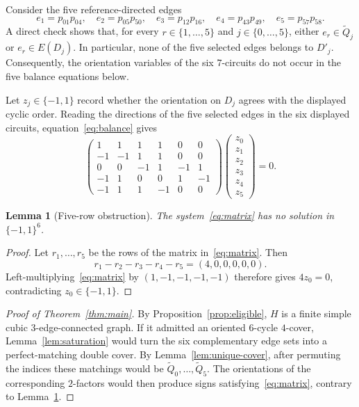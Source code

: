 \documentclass[11pt]{article}
\newtheorem{lemma}[theorem]{Lemma}
\theoremstyle{definition}
\begin{document}
Consider the five reference-directed edges
\begin{equation}\label{eq:selected-edges}
e_1=p_{01}p_{04},\quad
e_2=p_{05}p_{50},\quad
e_3=p_{12}p_{16},\quad
e_4=p_{43}p_{49},\quad
e_5=p_{57}p_{58}.
\end{equation}
A direct check shows that, for every $r\in\{1,\ldots,5\}$ and
$j\in\{0,\ldots,5\}$, either $e_r\in\widetilde Q_j$ or
$e_r\in E(D_j)$.  In particular, none of the five selected edges belongs to
$D'_j$.  Consequently, the orientation variables of the six $7$-circuits do
not occur in the five balance equations below.

Let $z_j\in\{-1,1\}$ record whether the orientation on $D_j$ agrees with the
displayed cyclic order.  Reading the directions of the five selected edges in
the six displayed circuits, equation~\eqref{eq:balance} gives
\begin{equation}\label{eq:matrix}
\begin{pmatrix}
 1& 1& 1& 1& 0& 0\\
-1&-1& 1& 1& 0& 0\\
 0& 0&-1& 1&-1& 1\\
-1& 1& 0& 0& 1&-1\\
-1& 1& 1&-1& 0& 0
\end{pmatrix}
\begin{pmatrix}
z_0\\
z_1\\
z_2\\
z_3\\
z_4\\
z_5
\end{pmatrix}
=0.
\end{equation}

\begin{lemma}[Five-row obstruction]\label{lem:obstruction}
The system~\eqref{eq:matrix} has no solution in $\{-1,1\}^6$.
\end{lemma}

\begin{proof}
Let $r_1,\ldots,r_5$ be the rows of the matrix in~\eqref{eq:matrix}.  Then
\[
r_1-r_2-r_3-r_4-r_5=(4,0,0,0,0,0).
\]
Left-multiplying~\eqref{eq:matrix} by $(1,-1,-1,-1,-1)$ therefore gives
$4z_0=0$, contradicting $z_0\in\{-1,1\}$.
\end{proof}

\begin{proof}[Proof of Theorem~\ref{thm:main}]
By Proposition~\ref{prop:eligible}, $H$ is a finite simple cubic
$3$-edge-connected graph.  If it admitted an oriented $6$-cycle $4$-cover,
Lemma~\ref{lem:saturation} would turn the six complementary edge sets into a
perfect-matching double cover.  By Lemma~\ref{lem:unique-cover}, after
permuting the indices these matchings would be
$\widetilde Q_0,\ldots,\widetilde Q_5$.  The orientations of the corresponding
$2$-factors would then produce signs satisfying~\eqref{eq:matrix}, contrary
to Lemma~\ref{lem:obstruction}.
\end{proof}
\end{document}
